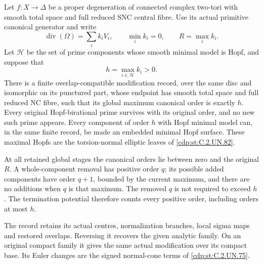 
\begin{proposition}\label{cdp:st:C.2.UN.84}
Let \(f:X\to\Delta\) be a proper degeneration of connected
complex two-tori with smooth total space and full reduced
SNC central fibre. Use its actual primitive canonical
generator and write
\[
 \operatorname{div}(\Omega)=\sum_i k_iV_i,\qquad
 \min_i k_i=0,\qquad R=\max_i k_i.
 \tag{C.TK.1}\label{cdp:eq:C.TK.1}
\]
Let \(\mathcal H\) be the set of prime components whose
smooth minimal model is Hopf, and suppose that
\[
                  h=\max_{i\in\mathcal H}k_i>0.
 \tag{C.TK.2}\label{cdp:eq:C.TK.2}
\]
There is a finite overlap-compatible modification record,
over the same disc and isomorphic on its punctured part,
whose endpoint has smooth total space and full reduced
NC fibre, such that its global maximum canonical order
is exactly \(h\). Every original Hopf-birational prime
survives with its original order, and no new such prime
appears. Every component of order \(h\) with Hopf minimal
model can, in the same finite record, be made an embedded
minimal Hopf surface. These maximal Hopfs are the
torsion-normal elliptic leaves of \ref{cdp:st:C.2.UN.82}.

At all retained global stages the canonical orders lie
between zero and the original \(R\). A whole-component
removal has positive order \(q\); its possible added
components have order \(q+1\), bounded by the current
maximum, and there are no additions when \(q\) is that
maximum. The removed \(q\) is not required to exceed
\(h\). The termination potential therefore counts every
positive order, including orders at most \(h\).

The record retains its actual centres, normalization
branches, local sigma maps and restored overlaps.
Reversing it recovers the given analytic family. On
an original compact family it gives the same actual
modification over its compact base. Its Euler changes
are the signed normal-cone terms of \ref{cdp:st:C.2.UN.75}.
\end{proposition}

